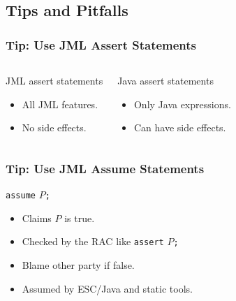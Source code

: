 \subsection[Tips/Pitfalls]{Tips and Pitfalls}

\begin{frame}
\frametitle{Tip: Use JML Assert Statements}

\begin{columns}[t]
\begin{block}{JML assert statements}
\begin{itemize}
\item
All JML features.

\item
No side effects.
\end{itemize}
\end{block}

\begin{block}{Java assert statements}
\begin{itemize}
\item
Only Java expressions.

\item
Can have side effects.
\end{itemize}
\end{block}
\end{columns}

\end{frame}

\begin{frame}[fragile]
\frametitle{Tip: Use JML Assume Statements}

\lstinline!assume! $P$\texttt{;}

\begin{itemize}
\item
Claims $P$ is true.

\item
Checked by the RAC like \lstinline!assert! $P$\texttt{;}

\item
Blame other party if false.

\item
Assumed by ESC/Java and static tools.
\end{itemize}
\end{frame}


